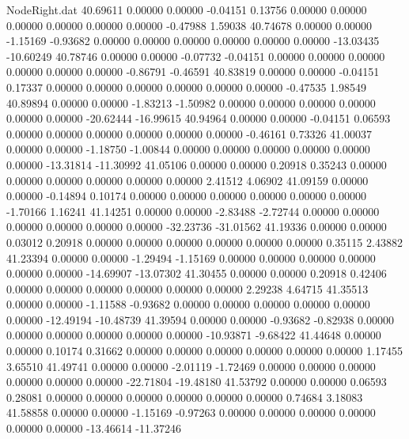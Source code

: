 \begin{filecontents}{NodeRight.dat}
  40.69611    0.00000    0.00000    -0.04151    0.13756    0.00000    0.00000    0.00000    0.00000    0.00000    0.00000   -0.47988    1.59038
  40.74678    0.00000    0.00000    -1.15169   -0.93682    0.00000    0.00000    0.00000    0.00000    0.00000    0.00000  -13.03435  -10.60249
  40.78746    0.00000    0.00000    -0.07732   -0.04151    0.00000    0.00000    0.00000    0.00000    0.00000    0.00000   -0.86791   -0.46591
  40.83819    0.00000    0.00000    -0.04151    0.17337    0.00000    0.00000    0.00000    0.00000    0.00000    0.00000   -0.47535    1.98549
  40.89894    0.00000    0.00000    -1.83213   -1.50982    0.00000    0.00000    0.00000    0.00000    0.00000    0.00000  -20.62444  -16.99615
  40.94964    0.00000    0.00000    -0.04151    0.06593    0.00000    0.00000    0.00000    0.00000    0.00000    0.00000   -0.46161    0.73326
  41.00037    0.00000    0.00000    -1.18750   -1.00844    0.00000    0.00000    0.00000    0.00000    0.00000    0.00000  -13.31814  -11.30992
  41.05106    0.00000    0.00000     0.20918    0.35243    0.00000    0.00000    0.00000    0.00000    0.00000    0.00000    2.41512    4.06902
  41.09159    0.00000    0.00000    -0.14894    0.10174    0.00000    0.00000    0.00000    0.00000    0.00000    0.00000   -1.70166    1.16241
  41.14251    0.00000    0.00000    -2.83488   -2.72744    0.00000    0.00000    0.00000    0.00000    0.00000    0.00000  -32.23736  -31.01562
  41.19336    0.00000    0.00000     0.03012    0.20918    0.00000    0.00000    0.00000    0.00000    0.00000    0.00000    0.35115    2.43882
  41.23394    0.00000    0.00000    -1.29494   -1.15169    0.00000    0.00000    0.00000    0.00000    0.00000    0.00000  -14.69907  -13.07302
  41.30455    0.00000    0.00000     0.20918    0.42406    0.00000    0.00000    0.00000    0.00000    0.00000    0.00000    2.29238    4.64715
  41.35513    0.00000    0.00000    -1.11588   -0.93682    0.00000    0.00000    0.00000    0.00000    0.00000    0.00000  -12.49194  -10.48739
  41.39594    0.00000    0.00000    -0.93682   -0.82938    0.00000    0.00000    0.00000    0.00000    0.00000    0.00000  -10.93871   -9.68422
  41.44648    0.00000    0.00000     0.10174    0.31662    0.00000    0.00000    0.00000    0.00000    0.00000    0.00000    1.17455    3.65510
  41.49741    0.00000    0.00000    -2.01119   -1.72469    0.00000    0.00000    0.00000    0.00000    0.00000    0.00000  -22.71804  -19.48180
  41.53792    0.00000    0.00000     0.06593    0.28081    0.00000    0.00000    0.00000    0.00000    0.00000    0.00000    0.74684    3.18083
  41.58858    0.00000    0.00000    -1.15169   -0.97263    0.00000    0.00000    0.00000    0.00000    0.00000    0.00000  -13.46614  -11.37246

\end{filecontents}
